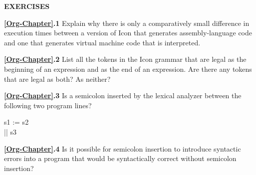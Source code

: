\bigskip

\noindent\textbf{EXERCISES}

\textbf{\ref*{Org-Chapter}.1}
Explain why there is only a comparatively small difference
in execution times between a version of Icon that generates
assembly-language code and one that generates virtual machine code
that is interpreted.

\textbf{\ref*{Org-Chapter}.2}
List all the tokens in the Icon grammar that are legal as the
beginning of an expression and as the end of an expression. Are there
any tokens that are legal as both? As neither?

\textbf{\ref*{Org-Chapter}.3}
Is a semicolon inserted by the lexical analyzer between the
following two program lines?

\begin{iconcode}
\>s1 := s2\\
\>|| s3
\end{iconcode}

\textbf{\ref*{Org-Chapter}.4}
Is it possible for semicolon insertion to introduce
syntactic errors into a program that would be syntactically correct
without semicolon insertion?

